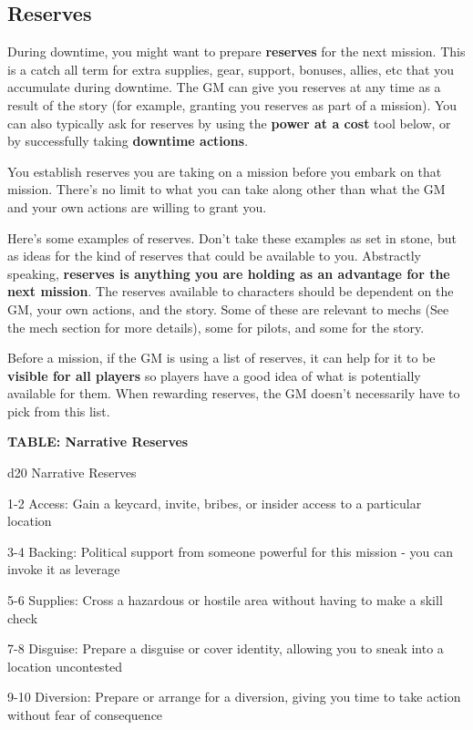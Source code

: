 \subsection{Reserves}

During downtime, you might want to prepare \textbf{reserves} for the next mission. This is a catch all term for extra supplies, gear, support, bonuses, allies, etc that you accumulate during downtime. The GM can give you reserves at any time as a result of the story (for example, granting you reserves as part of a mission). You can also typically ask for reserves by using the\textbf{ power at a cost} tool below, or by successfully taking \textbf{downtime actions}.

You establish reserves you are taking on a mission before you embark on that mission. There's no limit to what you can take along other than what the GM and your own actions are willing to grant you.

Here's some examples of reserves. Don't take these examples as set in stone, but as ideas for the kind of reserves that could be available to you. Abstractly speaking, \textbf{reserves is anything you are holding as an advantage for the next mission}. The reserves available to characters should be dependent on the GM, your own actions, and the story. Some of these are relevant to mechs (See the mech section for more details), some for pilots, and some for the story.

Before a mission, if the GM is using a list of reserves, it can help for it to be \textbf{visible for all players} so players have a good idea of what is potentially available for them. When rewarding reserves, the GM doesn't necessarily have to pick from this list.

\textbf{TABLE: Narrative Reserves}

d20       Narrative	Reserves

1-2     Access: Gain a keycard, invite, bribes, or insider access to a particular location

3-4     Backing: Political support from someone powerful for this mission - you can invoke it as leverage
 
5-6     Supplies: Cross a hazardous or hostile area without having to make a skill check

7-8     Disguise: Prepare a disguise or cover identity, allowing you to sneak into a location uncontested
 
9-10    Diversion: Prepare or arrange for a diversion, giving you time to take action without fear of consequence

